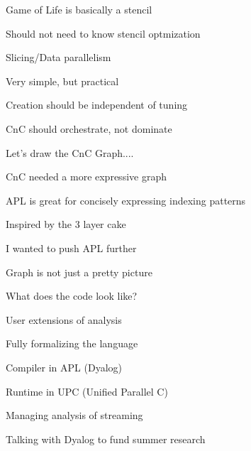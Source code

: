 \newslide


\newslide


Game of Life is basically a stencil

Should not need to know stencil optmization

Slicing/Data parallelism

\newslide


Very simple, but practical

Creation should be independent of tuning

CnC should orchestrate, not dominate

\newslide


Let's draw the CnC Graph....

\newslide
{}
\newslide


CnC needed a more expressive graph

APL is great for concisely expressing indexing patterns

Inspired by the 3 layer cake

I wanted to push APL further

\newslide


Graph is not just a pretty picture

What does the code look like?

\newslide


User extensions of analysis

Fully formalizing the language

\newslide
{}
\newslide


Compiler in APL (Dyalog)

Runtime in UPC (Unified Parallel C)

Managing analysis of streaming

Talking with Dyalog to fund summer research

\newslide


